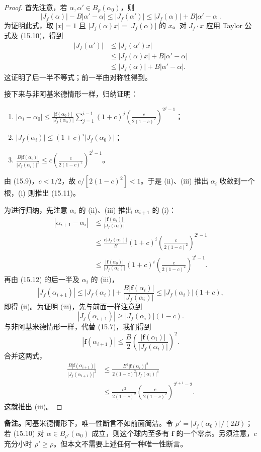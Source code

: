 \begin{proof}
首先注意，若 $\alpha,\alpha'\in B_\rho(\alpha_0)$，则
\begin{equation*}\tag{15.12}
|J_f(\alpha)|-B|\alpha'-\alpha|\le|J_f(\alpha')|
\le|J_f(\alpha)|+B|\alpha'-\alpha|.
\end{equation*}
为证明此式，取 $|x|=1$ 且 $|J_f(\alpha)x|=|J_f(\alpha)|$ 的 $x$。对 $J_f\cdot x$ 应用 Taylor 公式及 (15.10)，得到
\begin{align*}
|J_f(\alpha')|&\le|J_f(\alpha')x|\\
&\le|J_f(\alpha)x|+B|\alpha'-\alpha|\\
&\le|J_f(\alpha)|+B|\alpha'-\alpha|.
\end{align*}
这证明了后一半不等式；前一半由对称性得到。

接下来与非阿基米德情形一样，归纳证明：
\begin{enumerate}[label=(\roman*).]
\item $\displaystyle |\alpha_i-\alpha_0|\le\frac{|\mathbf f(\alpha_0)|}{|J_f(\alpha_0)|}
\sum_{j=1}^{i-1}(1+c)^j\left(\frac{c}{2(1-c)^2}\right)^{2^j-1}$；
\item $|J_f(\alpha_i)|\le(1+c)^i|J_f(\alpha_0)|$；
\item $\displaystyle\frac{B|\mathbf f(\alpha_i)|}{|J_f(\alpha_i)|^2}
\le c\left(\frac{c}{2(1-c)^2}\right)^{2^i-1}$。
\end{enumerate}
由 (15.9)，$c<1/2$，故 $c/[2(1-c)^2]<1$。于是 (ii)、(iii) 推出 $\alpha_i$ 收敛到一个根，(i) 则推出 (15.11)。

为进行归纳，先注意 $\alpha_i$ 的 (ii)、(iii) 推出 $\alpha_{i+1}$ 的 (i)：
\begin{align*}
|\alpha_{i+1}-\alpha_i|
&\le\frac{|\mathbf f(\alpha_i)|}{|J_f(\alpha_i)|}\\
&\le\frac{c|J_f(\alpha_0)|}{B}(1+c)^i
\left(\frac{c}{2(1-c)^2}\right)^{2^i-1}\\
&\le\frac{|\mathbf f(\alpha_0)|}{|J_f(\alpha_0)|}(1+c)^i
\left(\frac{c}{2(1-c)^2}\right)^{2^i-1}.
\end{align*}
再由 (15.12) 的后一半及 $\alpha_i$ 的 (iii)，
\[
|J_f(\alpha_{i+1})|\le|J_f(\alpha_i)|+\frac{B|\mathbf f(\alpha_i)|}{|J_f(\alpha_i)|}
\le|J_f(\alpha_i)|(1+c),
\]
即得 (ii)。为证明 (iii)，先与前面一样注意到
\[
|J_f(\alpha_{i+1})|\ge|J_f(\alpha_i)|(1-c).
\]
与非阿基米德情形一样，代替 (15.7)，我们得到
\[
|\mathbf f(\alpha_{i+1})|\le\frac B2
\left(\frac{|\mathbf f(\alpha_i)|}{|J_f(\alpha_i)|}\right)^2.
\]
合并这两式，
\begin{align*}
\frac{B|\mathbf f(\alpha_{i+1})|}{|J_f(\alpha_{i+1})|^2}
&\le\frac{B^2|\mathbf f(\alpha_i)|^2}{2(1-c)^2|J_f(\alpha_i)|^4}\\
&\le\frac{c^2}{2(1-c)^2}
\left(\frac{c}{2(1-c)^2}\right)^{2^{i+1}-2}.
\end{align*}
这就推出 (iii)。
\end{proof}
\noindent\textbf{备注。}阿基米德情形下，唯一性断言不如前面简洁。令 $\rho'=|J_f(\alpha_0)|/(2B)$；若 (15.10) 对 $\alpha\in B_{\rho'}(\alpha_0)$ 成立，则这个球内至多有 $\mathbf f$ 的一个零点。另须注意，$c$ 充分小时 $\rho'\ge\rho$。但本文不需要上述任何一种唯一性断言。

